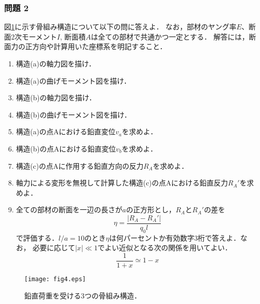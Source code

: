 \documentclass[10pt,a4j]{jarticle}
\begin{document}
\subsubsection*{問題 2}
図\ref{fig:fig4}に示す骨組み構造について以下の問に答えよ． 
なお，部材のヤング率$E$、断面2次モーメント$I$, 断面積$A$は全ての部材で共通かつ一定とする．
解答には，断面力の正方向や計算用いた座標系を明記すること．
\begin{enumerate}
\item
	構造(a)の軸力図を描け．
\item
	構造(a)の曲げモーメント図を描け．
\item
	構造(b)の軸力図を描け．
\item
	構造(b)の曲げモーメント図を描け．
\item
	構造(a)の点Aにおける鉛直変位$v_a$を求めよ．
\item
	構造(b)の点Aにおける鉛直変位$v_b$を求めよ．
\item
	構造(c)の点Aに作用する鉛直方向の反力$R_A$を求めよ．
\item
	軸力による変形を無視して計算した構造(c)の点Aにおける鉛直反力$R_A'$を求めよ．
\item
	全ての部材の断面を一辺の長さが$a$の正方形とし，$R_A$と$R_A'$の差を
	\begin{equation}
		\eta =\frac{|R_A-R_A'|}{q_0l}
		\label{eqn:}
	\end{equation}
	で評価する．$l/a=10$のとき$\eta$は何パーセントか有効数字3桁で答えよ．なお，
	必要に応じて$|x|\ll 1$でよい近似となる次の関係を用いてよい．
	\begin{equation}
		\frac{1}{1+x}\simeq 1-x
	\label{eqn:}
	\end{equation}
\end{enumerate}
\begin{figure}[h]
	\begin{center}
	\texttt{[image: fig4.eps]} 
	\end{center}
	\caption{鉛直荷重を受ける3つの骨組み構造．} 
	\label{fig:fig4}
\end{figure}
\end{document}
